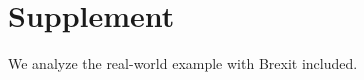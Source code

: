 \documentclass[11pt]{article}
\def\t#1{\tilde{#1}} %
\theoremstyle{definition}
\begin{document}

\section{Supplement}
We analyze the real-world example with Brexit included.

\clearpage



 
\end{document}
